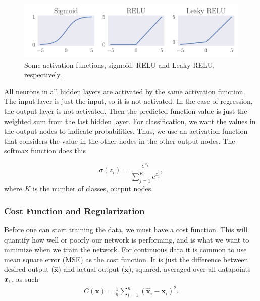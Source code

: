 \documentclass[12pt]{extarticle}
\begin{document}
\begin{figure}[h]
	\includegraphics[width=\linewidth]{pictures/activation_functions.pdf}
	\caption{Some activation functions, sigmoid, RELU and Leaky RELU, respectively.}\label{fig:activation_functions}
\end{figure}

All neurons in all hidden layers are activated by the same activation function. The input layer is just the input, so it is not activated. In the case of regression, the output layer is not activated. Then the predicted function value is just the weighted sum from the last hidden layer. For classification, we want the values in the output nodes to indicate probabilities. Thus, we use an activation function that considers the value in the other nodes in the other output nodes. The softmax function does this

\begin{equation} \label{eq:softmax}
	\sigma(z_i) = \frac{e^{z_i}}{\sum_{j=1}^Ke^{z_j}},
\end{equation}
where $K$ is the number of classes, output nodes.

\subsubsection{Cost Function and Regularization}\label{sec:cost_func_and_regul}
Before one can start training the data, we must have a cost function. This will quantify how well or poorly our network is performing, and is what we want to minimize when we train the network. For continuous data it is common to use mean square error (MSE) as the cost function. It is just the difference between desired output ($\hat{\mathbf{x}}$) and actual output ($\mathbf{x}$), squared, averaged over all datapoints $\boldsymbol x_i$, as such
\begin{align}
	C(\mathbf{x}) = \frac{1}{n}\sum_{i=1}^{n}(\hat{\mathbf{x}}_i - \mathbf{x}_i)^2.
	\label{eq:MSE}
\end{align}
\end{document}
